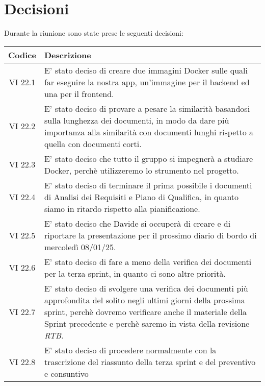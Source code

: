 
\section{Decisioni}

Durante la riunione sono state prese le seguenti decisioni:

\vspace{0.5cm}

\begin{table}[htbp]
    \centering
    \begin{tabular}{|c|p{}|}
        \hline
        \rowcolor[gray]{0.75}
        \textbf{Codice} & \textbf{Descrizione}\\
        \hline
        VI 22.1 & E' stato deciso di creare due immagini Docker sulle quali far eseguire la nostra app, un'immagine per il backend ed una per
        il frontend.\\
        \hline
        VI 22.2 & E' stato deciso di provare a pesare la similarità basandosi sulla lunghezza dei documenti, in modo da dare più importanza alla similarità
        con documenti lunghi rispetto a quella con documenti corti.\\
        \hline
        VI 22.3 & E' stato deciso che tutto il gruppo si impegnerà a studiare Docker, perchè utilizzeremo lo strumento nel progetto.\\
        \hline
        VI 22.4 & E' stato deciso di terminare il prima possibile i documenti di Analisi dei Requisiti e Piano di Qualifica, 
        in quanto siamo in ritardo rispetto alla pianificazione.\\
        \hline
        VI 22.5 & E' stato deciso che Davide si occuperà di creare e di riportare la presentazione per il prossimo diario di bordo
        di mercoledì 08/01/25.\\
        \hline
        VI 22.6 & E' stato deciso di fare a meno della verifica dei documenti per la terza sprint, in quanto ci sono altre priorità.\\
        \hline
        VI 22.7 & E' stato deciso di svolgere una verifica dei documenti più approfondita del solito negli ultimi giorni della prossima sprint,
        perchè dovremo verificare anche il materiale della Sprint precedente e perchè saremo in vista della revisione \emph{RTB}.\\
        \hline
        VI 22.8 & E' stato deciso di procedere normalmente con la trascrizione del riassunto della terza sprint e del preventivo e consuntivo

\end{tabular}
\end{table}

